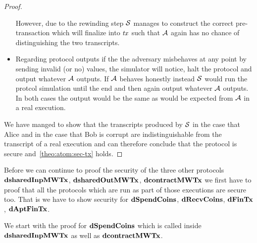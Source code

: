 \begin{proof}
\begin{itemize}
        However, due to the rewinding step $\mathcal{S}$ manages to construct the correct pre-transaction which will finalize into $\mathit{tx}$ such that $\mathcal{A}$ again has no chance of distinguishing the two transcripts.
        \item Regarding protocol outputs if the the adversary misbehaves at any point by sending invalid (or no) values, the simulator will notice, halt the protocol and output whatever $\mathcal{A}$ outputs.
        If $\mathcal{A}$ behaves honestly instead $\mathcal{S}$ would run the protcol simulation until the end and then again output whatever $\mathcal{A}$ outputs.
        In both cases the output would be the same as would be expected from $\mathcal{A}$ in a real execution.
    \end{itemize}

    We have manged to show that the transcripts produced by $\mathcal{S}$ in the case that Alice and in the case that Bob is corrupt are indistinguishable from the transcript of a real execution and can therefore conclude that the protocol is secure and~\cref{theo:atom:sec-tx} holds.

\end{proof}

Before we can continue to proof the security of the three other protocols $\mathbf{dsharedInpMWTx}$, $\mathbf{dsharedOutMWTx}$, $\mathbf{dcontractMWTx}$ we first have to proof that all the protocols which are run as part of those executions are secure too.
That is we have to show security for $\mathbf{dSpendCoins}$, $\mathbf{dRecvCoins}$, $\mathbf{dFinTx}$, $\mathbf{dAptFinTx}$.

We start with the proof for $\mathbf{dSpendCoins}$ which is called inside $\mathbf{dsharedInpMWTx}$ as well as $\mathbf{dcontractMWTx}$.

